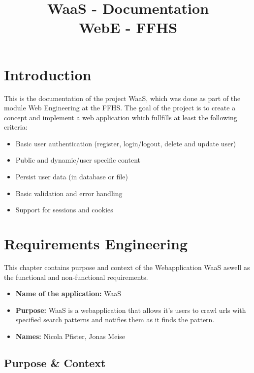 \documentclass[titlepage, 12pt]{article}
\author{\authorName}
\title{WaaS - Documentation \\ \medskip \large WebE - FFHS}
\begin{document}
\maketitle

\pagebreak

\renewcommand{\contentsname}{Table of Contents}

\tableofcontents

\pagebreak

\section{Introduction}

This is the documentation of the project WaaS, which was done as part of the module Web Engineering at the FFHS. The goal of the project is to create a concept and implement a web application which fullfills at least the following criteria:

\begin{itemize}
    \item Basic user authentication (register, login/logout, delete and update user)
    \item Public and dynamic/user specific content
    \item Persist user data (in database or file)
    \item Basic validation and error handling
    \item Support for sessions and cookies
\end{itemize}

\section{Requirements Engineering\label{sectionRequirementsEngineering}}

This chapter contains purpose and context of the Webapplication WaaS aswell as the functional and non-functional requirements.

\begin{itemize}
  \item \textbf{Name of the application:} WaaS
  \item \textbf{Purpose:} WaaS is a webapplication that allows it's users to crawl urls with specified search patterns and notifies them as it finds the pattern.
  \item \textbf{Names:} Nicola Pfister, Jonas Meise
\end{itemize}

\subsection{Purpose \& Context}
\end{document}
